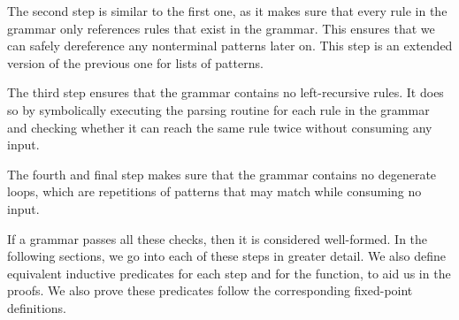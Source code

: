 The second step is similar to the first one,
as it makes sure that every rule in the grammar
only references rules that exist in the grammar.
This ensures that we can safely
dereference any nonterminal patterns later on.
This step is an extended version of the previous one
for lists of patterns.

The third step
ensures that the grammar contains no
left-recursive rules.
It does so by symbolically executing the parsing routine
for each rule in the grammar
and checking whether it can reach the same rule twice
without consuming any input.

The fourth and final step
makes sure that the grammar contains
no degenerate loops,
which are repetitions of patterns
that may match while consuming no input.

If a grammar passes all these checks,
then it is considered well-formed.
In the following sections,
we go into each of these steps
in greater detail.
We also define equivalent inductive predicates
for each step and for the \textit{\verifygrammarname{}} function,
to aid us in the proofs.
We also prove these predicates
follow the corresponding fixed-point definitions.






